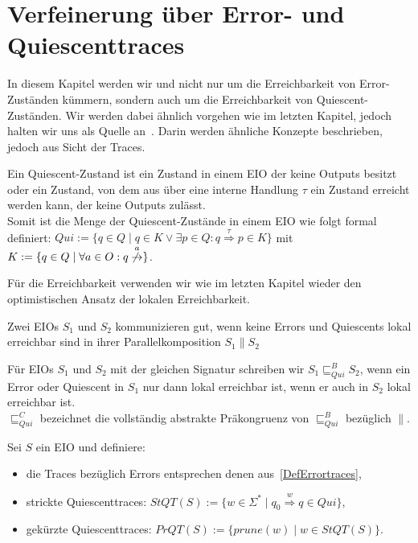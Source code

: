 \chapter{Verfeinerung über Error- und Quiescenttraces}

In diesem Kapitel werden wir und nicht nur um die Erreichbarkeit von
Error-Zuständen kümmern, sondern auch um die Erreichbarkeit von
Quiescent-Zuständen. Wir werden dabei ähnlich vorgehen wie im letzten Kapitel,
jedoch halten wir uns als Quelle an~\cite{Chilton2013}. Darin werden ähnliche Konzepte
beschrieben, jedoch aus Sicht der Traces.

\begin{Def}[Quiescent]
  Ein Quiescent-Zustand ist ein Zustand in einem EIO der keine Outputs besitzt
  oder ein Zustand, von dem aus über eine interne Handlung $\tau$ ein Zustand
  erreicht werden kann, der keine Outputs zulässt.\\
  Somit ist die Menge der Quiescent-Zustände in einem EIO wie folgt formal
  definiert: $Qui:=\{q\in Q\mid q\in K\vee \exists p\in Q:
  q\overset{\tau}{\Rightarrow} p\in K\}$ mit $K:=\{q\in Q\mid \forall a\in O:
  q\overset{a}{\not{\hspace{-0.1cm}\rightarrow}}\}$.
\end{Def}

Für die Erreichbarkeit verwenden wir wie im letzten Kapitel wieder den
optimistischen Ansatz der lokalen Erreichbarkeit.

\begin{Def}
  Zwei EIOs $S_1$ und $S_2$ kommunizieren gut, wenn keine Errors und Quiescents
  lokal erreichbar sind in ihrer Parallelkomposition $S_1\| S_2$
\end{Def}

\begin{Def}
  Für EIOs $S_1$ und $S_2$ mit der gleichen Signatur schreiben wir
  $S_1\sqsubseteq _{Qui}^B S_2$, wenn ein Error oder Quiescent in $S_1$ nur
  dann lokal erreichbar ist, wenn er auch in $S_2$ lokal erreichbar ist.\\
  $\sqsubseteq _{Qui}^C$ bezeichnet die vollständig abstrakte Präkongruenz von
  $\sqsubseteq  _{Qui}^ B$ bezüglich $\|$.
\end{Def}

\begin{Def}
  \label{DefQuiescenttraces}
  Sei $S$ ein EIO und definiere:
  \begin{itemize}
    \item die Traces bezüglich Errors entsprechen denen
      aus~\ref{DefErrortraces},
    \item strickte Quiescenttraces: $StQT(S) := \{w\in\Sigma ^*\mid q_0
      \overset{w}{\Rightarrow} q\in Qui\}$,
    \item gekürzte Quiescenttraces: $PrQT(S) :=\{prune(w)\mid w\in StQT(S)\}$.
  \end{itemize}
\end{Def}


